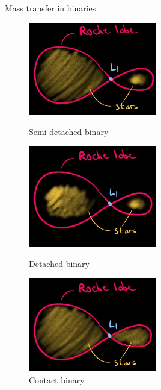 \documentclass{beamer}
\begin{document}
\begin{frame}{Mass transfer in binaries}
    \begin{figure}
        \begin{minipage}{0.7\textwidth}
            \centering
            \includegraphics[width=0.5\textwidth]{figs/semi-detached_binary.jpg}
            \caption{Semi-detached binary}
            \label{fig:semi-detached_binary}        
        \end{minipage}
        \begin{minipage}{0.5\textwidth}
            \centering
            \includegraphics[width=0.5\textwidth]{figs/detached_binary.jpg}
            \caption{Detached binary}
            \label{fig:detached_binary}
        \end{minipage}%
        \begin{minipage}{0.5\textwidth}
            \centering
            \includegraphics[width=0.5\textwidth]{figs/contact_binary.jpg}
            \caption{Contact binary}
            \label{fig:contact_binary}
        \end{minipage}
    \end{figure}
\end{frame}
\end{document}

